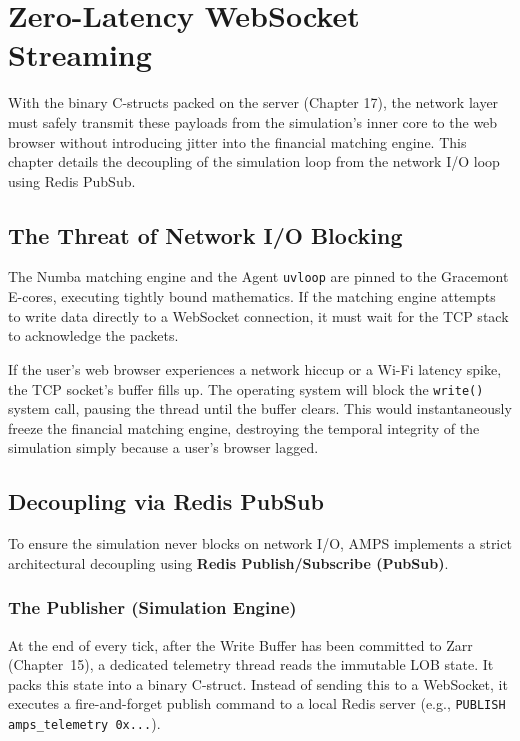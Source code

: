 \chapter{Zero-Latency WebSocket Streaming}
\label{ch:websocket_streaming}

With the binary C-structs packed on the server (Chapter 17), the network layer must safely transmit these payloads from the simulation's inner core to the web browser without introducing jitter into the financial matching engine. This chapter details the decoupling of the simulation loop from the network I/O loop using Redis PubSub.

\section{The Threat of Network I/O Blocking}

The Numba matching engine and the Agent \texttt{uvloop} are pinned to the Gracemont E-cores, executing tightly bound mathematics. If the matching engine attempts to write data directly to a WebSocket connection, it must wait for the TCP stack to acknowledge the packets. 

If the user's web browser experiences a network hiccup or a Wi-Fi latency spike, the TCP socket's buffer fills up. The operating system will block the \texttt{write()} system call, pausing the thread until the buffer clears. This would instantaneously freeze the financial matching engine, destroying the temporal integrity of the simulation simply because a user's browser lagged.

\section{Decoupling via Redis PubSub}

To ensure the simulation never blocks on network I/O, AMPS implements a strict architectural decoupling using \textbf{Redis Publish/Subscribe (PubSub)}.

\subsection{The Publisher (Simulation Engine)}
At the end of every tick, after the Write Buffer has been committed to Zarr \cite{zarr2023dev} (Chapter~15), a dedicated telemetry thread reads the immutable LOB state. It packs this state into a binary C-struct. Instead of sending this to a WebSocket, it executes a fire-and-forget publish command to a local Redis server (e.g., \texttt{PUBLISH amps\_telemetry 0x...}). 

